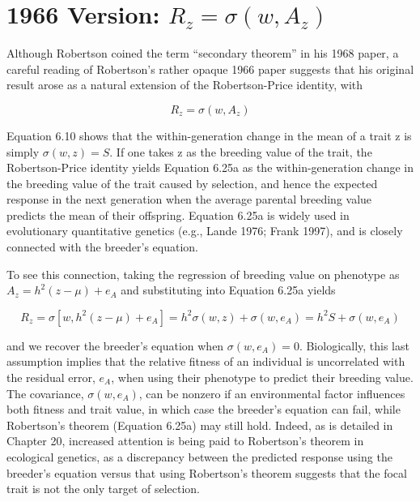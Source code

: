 \documentclass{article}
\begin{document}
\section{1966 Version:  $ R_{z} = \sigma(w, A_{z}) $}
Although Robertson coined the term “secondary theorem” in his 1968 paper, a careful reading of Robertson’s rather opaque 1966 paper suggests that his original result arose as a natural extension of the Robertson-Price identity, with

\begin{equation}
R_{z}=\sigma(w,A_{z})
\tag{6.25a}
\label{eq:6_25a}
\end{equation}

Equation 6.10 shows that the within-generation change in the mean of a trait z is simply  $ \sigma(w, z) = S $. If one takes z as the breeding value of the trait, the Robertson-Price identity yields Equation 6.25a as the within-generation change in the breeding value of the trait caused by selection, and hence the expected response in the next generation when the average parental breeding value predicts the mean of their offspring. Equation 6.25a is widely used in evolutionary quantitative genetics (e.g., Lande 1976; Frank 1997), and is closely connected with the breeder's equation.

To see this connection, taking the regression of breeding value on phenotype as  $ A_z = h^2(z - \mu) + e_A $ and substituting into Equation 6.25a yields

\begin{equation}
R_{z}=\sigma\left[w,h^{2}(z-\mu)+e_{A}\right]=h^{2}\sigma(w,z)+\sigma(w,e_{A})=h^{2}S+\sigma(w,e_{A})
\tag{6.25b}
\label{eq:6_25b}
\end{equation}

and we recover the breeder’s equation when  $ \sigma(w, e_A) = 0 $. Biologically, this last assumption implies that the relative fitness of an individual is uncorrelated with the residual error,  $ e_A $, when using their phenotype to predict their breeding value. The covariance,  $ \sigma(w, e_A) $, can be nonzero if an environmental factor influences both fitness and trait value, in which case the breeder’s equation can fail, while Robertson’s theorem (Equation 6.25a) may still hold. Indeed, as is detailed in Chapter 20, increased attention is being paid to Robertson’s theorem in ecological genetics, as a discrepancy between the predicted response using the breeder’s equation versus that using Robertson’s theorem suggests that the focal trait is not the only target of selection.
\end{document}

